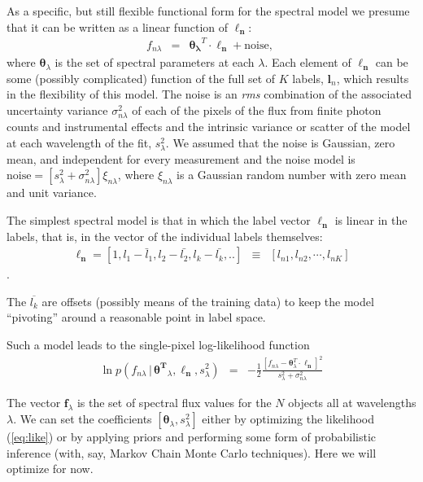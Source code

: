 \documentclass[12pt, preprint]{aastex}
\newcommand{\set}[1]{\bm{#1}}
\newcommand{\mean}[1]{\overline{#1}}
\newcommand{\given}{\,|\,}
\begin{document}
As a specific, but still flexible functional form for the spectral model we presume that it can be written as
a linear function of $\boldsymbol{\ell_n}$: 
\begin{eqnarray}
f_{n\lambda} &=&
\boldsymbol{\theta_\lambda}^T \cdot \boldsymbol{\ell_n} + \mbox{noise},
\
\label{eq:linearmodel}
\end{eqnarray}
where $\set{\theta}_\lambda$ is the set of spectral parameters at each $\lambda$.  Each element of $\boldsymbol{\ell_n}$ can be some (possibly complicated) function of the full set of $K$ labels, $\set{l}_n$, which
results in the flexibility of this model. The noise is an \textit{rms} combination of the associated uncertainty variance
$\sigma_{n\lambda}^2$ of each of the pixels of the flux from finite photon counts and instrumental effects and the intrinsic variance or scatter of the model at each wavelength of the fit, $s_\lambda^2$. We assumed that the noise is Gaussian, zero mean, and independent for every measurement and the noise model is $\mbox{noise} = [s_\lambda^2+ \sigma_{n\lambda}^2]\xi_{n\lambda}$, where $\xi_{n\lambda}$ is a Gaussian random number with zero mean and unit
variance.

The simplest spectral model is that in which the label vector $\boldsymbol{\ell_n}$ is
linear in the labels, that is, in the vector of the individual labels themselves:
\begin{eqnarray}
\set{\ell_n} =  [1, l_1 - \bar{l}_1, l_2 - \bar{l_2}, l_k - \bar{l_k}, .. ] &\equiv& [l_{n1}, l_{n2}, \cdots, l_{nK}]
\label{eq:linear}
\end{eqnarray}.

The $\mean{l_k}$ are offsets (possibly means of the training data) to keep the model ``pivoting'' around a reasonable point in label space.


Such a  model leads to the single-pixel log-likelihood function 
\begin{eqnarray}
\ln p(f_{n\lambda}\given\set{\theta^T}_\lambda, \boldsymbol{\ell_n}, s_\lambda^2) &=&
 -\frac{1}{2}\frac{[f_{n\lambda} - \set{\theta}^T_\lambda \cdot \set{\ell_n}]^2}{s_\lambda^2 + \sigma_{n\lambda}^2}
\label{eq:like}
\end{eqnarray}


The vector $\set{f}_\lambda$ is the set of spectral flux values for
the $N$ objects all at wavelengths $\lambda$.
We can set the coefficients $[\set{\theta}_\lambda,s_\lambda^2]$ either by
optimizing the likelihood (\ref{eq:like}) or by applying priors and
performing some form of probabilistic inference (with, say, Markov
Chain Monte Carlo techniques).
Here we will optimize for now.
\end{document}

